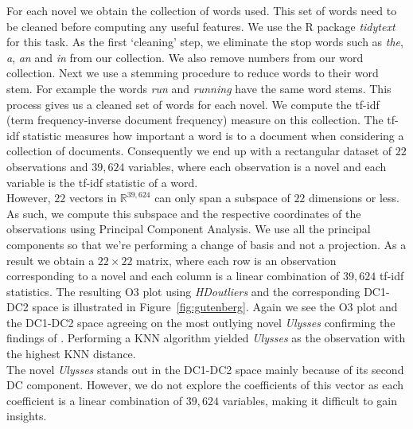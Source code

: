 \documentclass[11pt]{article}
\begin{document}
For each novel we obtain the collection of words used. This set of words need to be cleaned before computing any useful features. We use the R package \textit{tidytext} \citep{tidytext} for this task. As the first `cleaning' step, we eliminate the stop words such as \textit{the}, \textit{a}, \textit{an} and \textit{in} from our collection. We also remove numbers from our word collection.  Next we use a stemming procedure to reduce words to their word stem. For example the words \textit{run} and \textit{running} have the same word stems. This process gives us a cleaned set of words for each novel. We compute the tf-idf (term frequency-inverse document frequency) measure on this collection. The tf-idf statistic measures how important a word is to a document when considering a collection of documents.  Consequently we end up with a rectangular dataset of $22$ observations and $39,624$ variables, where each observation is a novel and each variable is the tf-idf statistic of a word. \\

However, $22$ vectors in $\mathbb{R}^{39,624}$ can only span a subspace of $22$ dimensions or less. As such, we compute this subspace and the respective coordinates of the observations using Principal Component Analysis. We use all the principal components so that we're  performing a change of basis and not a projection. As a result we obtain a $22\times 22$ matrix, where each row is an observation corresponding to a novel and each column is a linear combination of $39,624$ tf-idf statistics. The resulting O3 plot using \textit{HDoutliers} and the corresponding DC1-DC2 space is illustrated in Figure~\ref{fig:gutenberg}. Again we see the O3 plot and the DC1-DC2 space agreeing on the most outlying novel \textit{Ulysses} confirming the findings of \cite{wilkinson2017visualizing}. Performing a KNN algorithm yielded \textit{Ulysses} as the observation with the highest KNN distance.  \\

The novel \textit{Ulysses} stands out in the DC1-DC2 space mainly because of its second DC component. However, we do not explore the coefficients of this vector as each coefficient is a linear combination of  $39,624$ variables, making it difficult to gain insights. \\
\end{document}
